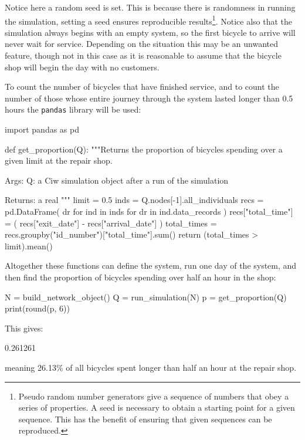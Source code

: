 Notice here a random seed is set. This is because there is randomness in running
the simulation, setting a seed ensures reproducible results\footnote{
Pseudo random number generators give a sequence of numbers that obey a series of
properties. A seed is necessary to obtain a starting point for a given sequence.
This has the benefit of ensuring that given sequences can be reproduced.
}.
Notice also that the simulation always begins with an empty system, so the first
bicycle to arrive will never wait for service. Depending on the situation this
may be an unwanted feature, though not in this case as it is reasonable to
assume that the bicycle shop will begin the day with no customers.

To count the number of bicycles that have finished service, and to
count the number of those whose entire journey through the system lasted longer
than 0.5 hours the \texttt{pandas}
library will be used:

\begin{pyin}
import pandas as pd


def get_proportion(Q):
    """Returns the proportion of bicycles spending over a given
    limit at the repair shop.

    Args:
        Q: a Ciw simulation object after a run of the
           simulation

    Returns:
        a real
    """
    limit = 0.5
    inds = Q.nodes[-1].all_individuals
    recs = pd.DataFrame(
        dr for ind in inds for dr in ind.data_records
    )
    recs["total_time"] = (
        recs["exit_date"] - recs["arrival_date"]
    )
    total_times = recs.groupby("id_number")["total_time"].sum()
    return (total_times > limit).mean()
\end{pyin}

Altogether these functions can define the system, run one day of the system, and
then find the proportion of bicycles spending over half an hour in the shop:

\begin{pyin}
N = build_network_object()
Q = run_simulation(N)
p = get_proportion(Q)
print(round(p, 6))
\end{pyin}

This gives:

\begin{pyout}
0.261261
\end{pyout}

meaning 26.13\% of all bicycles spent longer than half an hour at the repair
shop.


